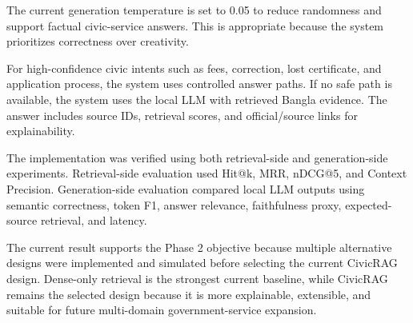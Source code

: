 The current generation temperature is set to 0.05 to reduce randomness and support factual civic-service answers. This is appropriate because the system prioritizes correctness over creativity.

For high-confidence civic intents such as fees, correction, lost certificate, and application process, the system uses controlled answer paths. If no safe path is available, the system uses the local LLM with retrieved Bangla evidence. The answer includes source IDs, retrieval scores, and official/source links for explainability.

The implementation was verified using both retrieval-side and generation-side experiments. Retrieval-side evaluation used Hit@k, MRR, nDCG@5, and Context Precision. Generation-side evaluation compared local LLM outputs using semantic correctness, token F1, answer relevance, faithfulness proxy, expected-source retrieval, and latency.

The current result supports the Phase 2 objective because multiple alternative designs were implemented and simulated before selecting the current CivicRAG design. Dense-only retrieval is the strongest current baseline, while CivicRAG remains the selected design because it is more explainable, extensible, and suitable for future multi-domain government-service expansion.
